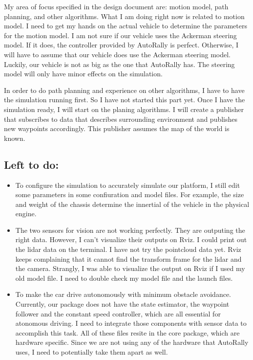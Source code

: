 \documentclass[compsoc,draftclsnofoot,onecolumn,10pt]{IEEEtran}
\begin{document}
My area of focus specified in the design document are: motion model, path planning, and other algorithms. What I am doing right now is related to motion model. I need to get my hands on the actual vehicle to determine the parameters for the motion model. I am not sure if our vehicle uses the Ackerman steering model. If it does, the controller provided by AutoRally is perfect. Otherwise, I will have to assume that our vehicle does use the Ackerman steering model. Luckily, our vehicle is not as big as the one that AutoRally has. The steering model will only have minor effects on the simulation. 

In order to do path planning and experience on other algorithms, I have to have the simulation running first. So I have not started this part yet. Once I have the simulation ready, I will start on the planing algorithms. I will create a publisher that subscribes to data that describes surrounding environment and publishes new waypoints accordingly. This publisher assumes the map of the world is known.

\subsection{Left to do:}
\begin{itemize}
	\item To configure the simulation to accurately simulate our platform, I still edit some parameters in some confiuration and model files. For example, the size and weight of the chassis determine the innertial of the vehicle in the physical engine.  
	\item The two sensors for vision are not working perfectly. They are outputing the right data. However, I can't visualize their outputs on Rviz. I could print out the lidar data on the terminal. I have not try the pointcloud data yet. Rviz keeps complaining that it cannot find the transform frame for the lidar and the camera. Strangly, I was able to visualize the output on Rviz if I used my old model file. I need to double check my model file and the launch files. 
	\item To make the car drive autonomously with minimum obstacle avoidance. Currently, our package does not have the state estimator, the waypoint follower and the constant speed controller, which are all essential for atonomous driving. I need to integrate those components with sensor data to accomplish this task. All of these files resite in the core package, which are hardware specific. Since we are not using any of the hardware that AutoRally uses, I need to potentially take them apart as well. 
\end{itemize}
\end{document}
